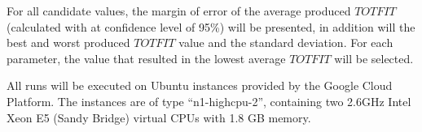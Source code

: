 For all candidate values, the margin of error of the average produced $TOTFIT$ (calculated with at confidence level of 95\%) will be presented, in addition will the best and worst produced $TOTFIT$ value and the standard deviation. For each parameter, the value that resulted in the lowest average $TOTFIT$ will be selected. 

All runs will be executed on Ubuntu instances provided by the Google Cloud Platform\citep{website:google}. The instances are of type ``n1-highcpu-2'', containing two 2.6GHz Intel Xeon E5 (Sandy Bridge) virtual CPUs with 1.8 GB memory. 

